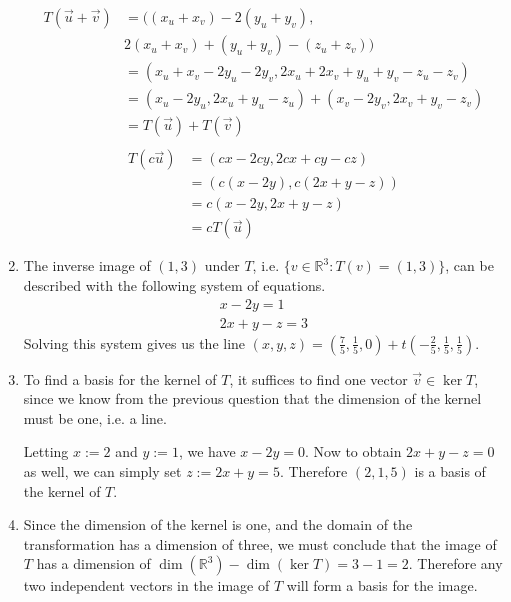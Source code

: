 \documentclass{article}
\newenvironment{answers}{ %
	\begin{enumerate}
		\setlength{\itemsep}{\bigskipamount}
}{\end{enumerate}}
\newcommand{\R}{\mathbb{R}}
\begin{document}
\begin{answers}
\begin{enumerate}
				\begin{align*}
					T(\vec{u} + \vec{v}) & = ((x_u + x_v) - 2(y_u + y_v), \\
					                     & 2(x_u + x_v) + (y_u + y_v) - (z_u + z_v)) \\
					                     & = (x_u + x_v - 2y_u - 2y_v, 2x_u + 2x_v + y_u + y_v - z_u - z_v) \\
					                     & = (x_u - 2y_u, 2x_u + y_u - z_u) + (x_v - 2y_v, 2x_v + y_v - z_v) \\
					                     & = T(\vec{u}) + T(\vec{v}) \\
				\end{align*}
				\begin{align*}
					T(c\vec{u}) & = (cx - 2cy, 2cx + cy - cz) \\
					            & = (c(x - 2y), c(2x + y - z)) \\
					            & = c(x - 2y, 2x + y - z) \\
					            & = cT(\vec{u})
				\end{align*}

			\item
				The inverse image of \((1, 3)\) under \(T\), i.e. \(\{v \in \R^3 : T(v) = (1,3)\}\), can be described with the following system of equations.
				\begin{gather*}
					x - 2y = 1 \\
					2x + y - z = 3
				\end{gather*}
				Solving this system gives us the line \((x, y, z) = (\frac{7}{5},\frac{1}{5},0) + t(-\frac{2}{5},\frac{1}{5},\frac{1}{5})\).

			\item
				To find a basis for the kernel of \(T\), it suffices to find one vector \(\vec{v} \in \ker T\), since we know from the previous question that the dimension of the kernel must be one, i.e. a line.

				Letting \(x := 2\) and \(y := 1\), we have \(x - 2y = 0\). Now to obtain \(2x + y -z = 0\) as well, we can simply set \(z := 2x+y = 5\). Therefore \((2, 1, 5)\) is a basis of the kernel of \(T\).

			\item
				Since the dimension of the kernel is one, and the domain of the transformation has a dimension of three, we must conclude that the image of \(T\) has a dimension of \(\dim(\R^3) - \dim(\ker T) = 3 - 1 = 2\). Therefore any two independent vectors in the image of \(T\) will form a basis for the image.


\end{enumerate}
\end{answers}
\end{document}
